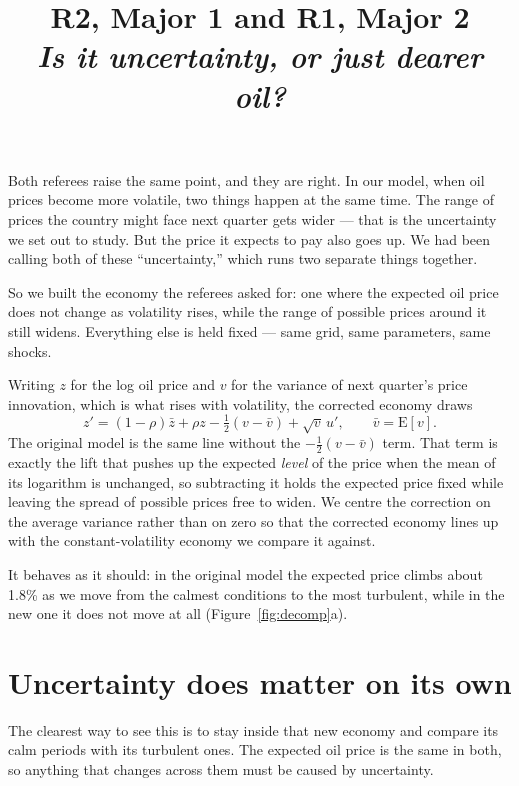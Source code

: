 \documentclass[11pt]{article}
\title{\textbf{R2, Major 1 \quad and \quad R1, Major 2}\\[0.3em]
       \large\normalfont\itshape Is it uncertainty, or just dearer oil?}
\author{}
\date{}
\begin{document}
\maketitle
\vspace{-3em}


Both referees raise the same point, and they are right. In our model, when oil
prices become more volatile, two things happen at the same time. The range of
prices the country might face next quarter gets wider --- that is the
uncertainty we set out to study. But the price it expects to pay also goes up.
We had been calling both of these ``uncertainty,'' which runs two separate things
together.

So we built the economy the referees asked for: one where the expected oil price
does not change as volatility rises, while the range of possible prices around
it still widens.
Everything else is held fixed --- same grid, same parameters, same shocks.

Writing $z$ for the log oil price and $v$ for the variance of next quarter's
price innovation, which is what rises with volatility, the corrected economy
draws
\[
  z' = (1-\rho)\bar{z} + \rho z - \tfrac{1}{2}\left(v - \bar{v}\right)
       + \sqrt{v}\, u',
  \qquad \bar{v} = \mathrm{E}[v].
\]
The original model is the same line without the $-\tfrac{1}{2}(v-\bar{v})$
term. That term is exactly the lift that pushes up the expected \emph{level} of
the price when the mean of its logarithm is unchanged, so subtracting it holds
the expected price fixed while leaving the spread of possible prices free to
widen. We centre the correction on the average variance rather than on zero so
that the corrected economy lines up with the constant-volatility economy we
compare it against.

It behaves as it should: in the original model the expected price climbs about
1.8\% as we move from the calmest conditions to the most turbulent, while in the
new one it does not move at all (Figure~\ref{fig:decomp}a).

\section*{Uncertainty does matter on its own}

The clearest way to see this is to stay inside that new economy and compare its
calm periods with its turbulent ones. The expected oil price is the same in
both, so anything that changes across them must be caused by uncertainty.
\end{document}
